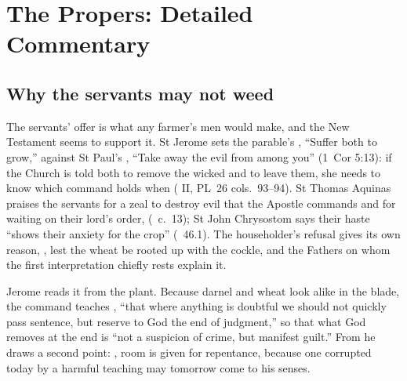 
\section{The Propers: Detailed Commentary}

\subsection{Why the servants may not weed}

The servants' offer is what any farmer's men would make, and the New
Testament seems to support it. St Jerome sets the parable's , ``Suffer both to grow,'' against St Paul's , ``Take away the evil from among you'' (1~Cor 5:13):
if the Church is told both to remove the wicked and to leave them, she needs
to know which command holds when ( II, PL~26 cols.~93--94).
St Thomas Aquinas praises the servants for a zeal to destroy evil that the
Apostle commands and for waiting on their lord's order, 
(\ c.~13); St John Chrysostom says their haste ``shows their
anxiety for the crop'' (\ 46.1). The householder's refusal
gives its own reason, , lest the wheat be rooted up with the cockle, and the Fathers on
whom the first interpretation chiefly rests explain it.

Jerome reads it from the plant. Because darnel and wheat look alike in the
blade, the command teaches , ``that where anything is
doubtful we should not quickly pass sentence, but reserve to God the end of
judgment,'' so that what God removes at the end is ``not a suspicion of
crime, but manifest guilt.'' From  he draws a second point:
, room is given for repentance, because one
corrupted today by a harmful teaching may tomorrow come to his senses.

